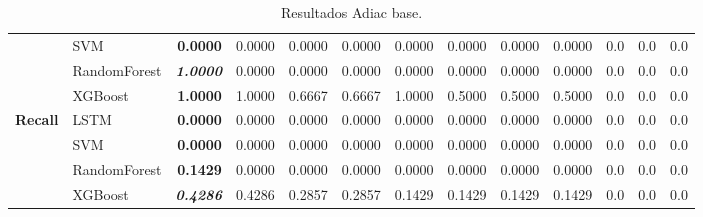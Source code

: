 \begin{table}[H]
\begin{adjustbox}{max width=12cm}
\begin{tabular}{|c|l|r|r|r|r|r|r|r|r|r|r|r|}
			&  SVM & \textbf{  0.0000 } &  0.0000 &  0.0000 &  0.0000 &  0.0000 &  0.0000 &  0.0000 &  0.0000 &  0.0 &  0.0 &  0.0 \\
			&  RandomForest & \textit{ \textbf{  1.0000 } } &  0.0000 &  0.0000 &  0.0000 &  0.0000 &  0.0000 &  0.0000 &  0.0000 &  0.0 &  0.0 &  0.0 \\
			&  XGBoost & \textbf{  1.0000 } &  1.0000 &  0.6667 &  0.6667 &  1.0000 &  0.5000 &  0.5000 &  0.5000 &  0.0 &  0.0 &  0.0 \\
			\hline
			\textbf{Recall} &  LSTM & \textbf{  0.0000 } &  0.0000 &  0.0000 &  0.0000 &  0.0000 &  0.0000 &  0.0000 &  0.0000 &  0.0 &  0.0 &  0.0 \\
			&  SVM & \textbf{  0.0000 } &  0.0000 &  0.0000 &  0.0000 &  0.0000 &  0.0000 &  0.0000 &  0.0000 &  0.0 &  0.0 &  0.0 \\
			&  RandomForest & \textbf{  0.1429 } &  0.0000 &  0.0000 &  0.0000 &  0.0000 &  0.0000 &  0.0000 &  0.0000 &  0.0 &  0.0 &  0.0 \\
			&  XGBoost & \textit{ \textbf{  0.4286 } } &  0.4286 &  0.2857 &  0.2857 &  0.1429 &  0.1429 &  0.1429 &  0.1429 &  0.0 &  0.0 &  0.0 \\
			\hline
		\end{tabular}
	\end{adjustbox}
	\caption{Resultados Adiac base.}
	\label{tab:Adiac_base}
\end{table}


